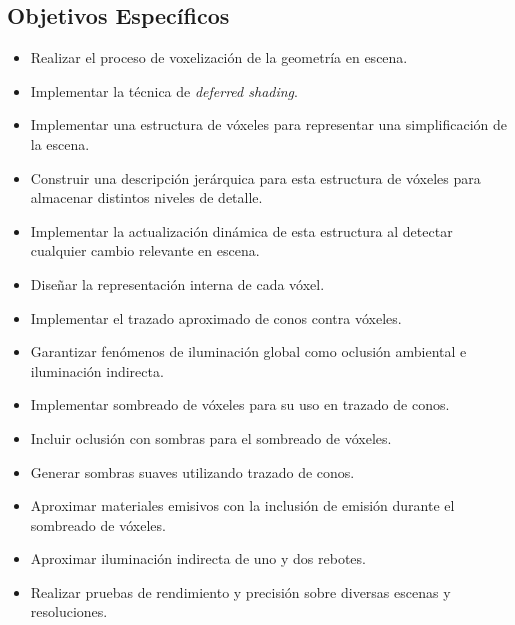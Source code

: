 \subsection*{Objetivos Específicos} %
\label{sub:objetivo_especifico}
\begin{itemize}
\item Realizar el proceso de voxelización de la geometría en escena.
\item Implementar la técnica de \emph{deferred shading}.
\item Implementar una estructura de vóxeles para representar una simplificación de la escena.
\item Construir una descripción jerárquica para esta estructura de vóxeles para almacenar distintos niveles de detalle.
\item Implementar la actualización dinámica de esta estructura al detectar cualquier cambio relevante en escena.
\item Diseñar la representación interna de cada vóxel.
\item Implementar el trazado aproximado de conos contra vóxeles.
\item Garantizar fenómenos de iluminación global como oclusión ambiental e iluminación indirecta.
\item Implementar sombreado de vóxeles para su uso en trazado de conos.
\item Incluir oclusión con sombras para el sombreado de vóxeles.
\item Generar sombras suaves utilizando trazado de conos.
\item Aproximar materiales emisivos con la inclusión de emisión durante el sombreado de vóxeles.
\item Aproximar iluminación indirecta de uno y dos rebotes.
\item Realizar pruebas de rendimiento y precisión sobre diversas escenas y resoluciones.
\end{itemize}
